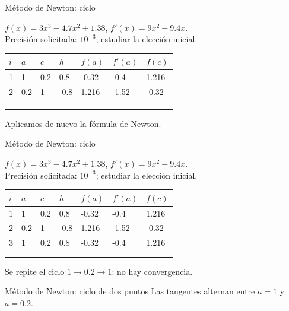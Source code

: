 \documentclass[original_version/main.tex]{subfiles}
\begin{document}
\begin{frame}[t]{Método de Newton: ciclo}
\begin{minipage}[t][17mm]{\textwidth}\small
$f(x)=3x^3-4.7x^2+1.38$, $f'(x)=9x^2-9.4x$.\\
Precisión solicitada: $10^{-3}$; estudiar la elección inicial.
\end{minipage}\begingroup\scriptsize\setlength{\tabcolsep}{2pt}
\begin{center}\begin{tabular}{|C{.04\textwidth}|*{6}{C{.135\textwidth}|}}\hline
$i$&$a$&$c$&$h$&$f(a)$&$f'(a)$&$f(c)$\\\hline
\rule{0pt}{5mm}1&1&0.2&0.8&-0.32&-0.4&1.216\\\hline
\rule{0pt}{5mm}2&0.2&1&-0.8&1.216&-1.52&-0.32\\\hline
\rule{0pt}{5mm}&&&&&&\\\hline
\rule{0pt}{5mm}&&&&&&\\\hline
\rule{0pt}{5mm}&&&&&&\\\hline
\end{tabular}\end{center}\endgroup\small Aplicamos de nuevo la fórmula de Newton.
\end{frame}
\begin{frame}[t]{Método de Newton: ciclo}
\begin{minipage}[t][17mm]{\textwidth}\small
$f(x)=3x^3-4.7x^2+1.38$, $f'(x)=9x^2-9.4x$.\\
Precisión solicitada: $10^{-3}$; estudiar la elección inicial.
\end{minipage}\begingroup\scriptsize\setlength{\tabcolsep}{2pt}
\begin{center}\begin{tabular}{|C{.04\textwidth}|*{6}{C{.135\textwidth}|}}\hline
$i$&$a$&$c$&$h$&$f(a)$&$f'(a)$&$f(c)$\\\hline
\rule{0pt}{5mm}1&1&0.2&0.8&-0.32&-0.4&1.216\\\hline
\rule{0pt}{5mm}2&0.2&1&-0.8&1.216&-1.52&-0.32\\\hline
\rule{0pt}{5mm}3&1&0.2&0.8&-0.32&-0.4&1.216\\\hline
\rule{0pt}{5mm}&&&&&&\\\hline
\rule{0pt}{5mm}&&&&&&\\\hline
\end{tabular}\end{center}\endgroup\small Se repite el ciclo $1\to0.2\to1$: no hay convergencia.
\end{frame}
\begin{frame}[t]{Método de Newton: ciclo de dos puntos}
Las tangentes alternan entre $a=1$ y $a=0.2$.
\end{frame}
\end{document}
